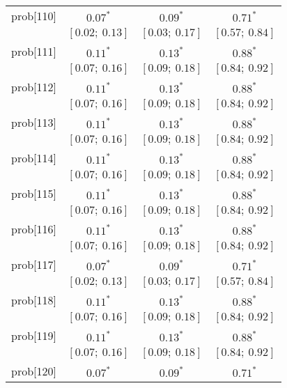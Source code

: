 \begin{table}
\begin{center}
\begin{tabular}{l c c c }
prob[110] & $0.07^{*}$              & $0.09^{*}$              & $0.71^{*}$            \\
          & $[0.02;\ 0.13]$         & $[0.03;\ 0.17]$         & $[0.57;\ 0.84]$       \\
prob[111] & $0.11^{*}$              & $0.13^{*}$              & $0.88^{*}$            \\
          & $[0.07;\ 0.16]$         & $[0.09;\ 0.18]$         & $[0.84;\ 0.92]$       \\
prob[112] & $0.11^{*}$              & $0.13^{*}$              & $0.88^{*}$            \\
          & $[0.07;\ 0.16]$         & $[0.09;\ 0.18]$         & $[0.84;\ 0.92]$       \\
prob[113] & $0.11^{*}$              & $0.13^{*}$              & $0.88^{*}$            \\
          & $[0.07;\ 0.16]$         & $[0.09;\ 0.18]$         & $[0.84;\ 0.92]$       \\
prob[114] & $0.11^{*}$              & $0.13^{*}$              & $0.88^{*}$            \\
          & $[0.07;\ 0.16]$         & $[0.09;\ 0.18]$         & $[0.84;\ 0.92]$       \\
prob[115] & $0.11^{*}$              & $0.13^{*}$              & $0.88^{*}$            \\
          & $[0.07;\ 0.16]$         & $[0.09;\ 0.18]$         & $[0.84;\ 0.92]$       \\
prob[116] & $0.11^{*}$              & $0.13^{*}$              & $0.88^{*}$            \\
          & $[0.07;\ 0.16]$         & $[0.09;\ 0.18]$         & $[0.84;\ 0.92]$       \\
prob[117] & $0.07^{*}$              & $0.09^{*}$              & $0.71^{*}$            \\
          & $[0.02;\ 0.13]$         & $[0.03;\ 0.17]$         & $[0.57;\ 0.84]$       \\
prob[118] & $0.11^{*}$              & $0.13^{*}$              & $0.88^{*}$            \\
          & $[0.07;\ 0.16]$         & $[0.09;\ 0.18]$         & $[0.84;\ 0.92]$       \\
prob[119] & $0.11^{*}$              & $0.13^{*}$              & $0.88^{*}$            \\
          & $[0.07;\ 0.16]$         & $[0.09;\ 0.18]$         & $[0.84;\ 0.92]$       \\
prob[120] & $0.07^{*}$              & $0.09^{*}$              & $0.71^{*}$            \\

\end{tabular}
\end{center}
\end{table}
